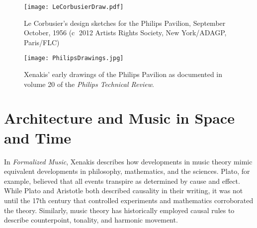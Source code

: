 \begin{figure*}[]
  \texttt{[image: LeCorbusierDraw.pdf]}
  \caption{Le Corbusier's design sketches for the Philips Pavilion,
    September \textendash{} October, 1956 (\textcircled{c} 2012
    Artists Rights Society, New York/ADAGP, Paris/FLC)}
  \label{fig:le-corbusier-sketch}
\end{figure*}

\begin{figure*}[h]
  \texttt{[image: PhilipsDrawings.jpg]}
  \caption{Xenakis' early drawings of the Philips Pavilion as
    documented in volume 20 of the \textit{Philips Technical Review}.}
  \label{fig:xenakis-draw}
\end{figure*}

\section{Architecture and Music in Space and Time}
\label{sec:introduction-conclusion}

In \textit{Formalized Music}\cite{xenakis1992formalized}, Xenakis
describes how developments in music theory mimic equivalent
developments in philosophy, mathematics, and the sciences. Plato, for
example, believed that all events transpire as determined by cause and
effect. While Plato and Aristotle both described causality in their
writing, it was not until the 17th century that controlled experiments
and mathematics corroborated the theory.
Similarly, music theory has historically employed causal rules to
describe counterpoint, tonality, and harmonic movement.

